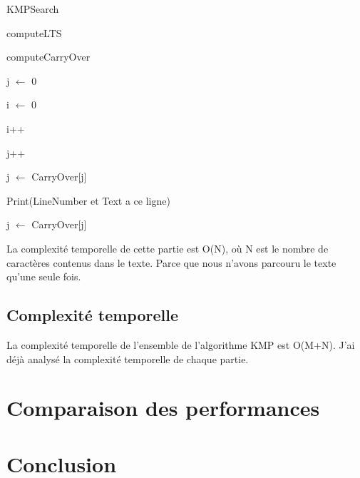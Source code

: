 \documentclass[11pt,english]{article}
\begin{document}
\begin{algorithm}[htbp]
    \SetAlFnt{\footnotesize\sf}

    \caption{KMPSearch}
    
    \Begin
    {
        computeLTS

        computeCarryOver

        j $\leftarrow$ 0

        i $\leftarrow$ 0

        {
            {
               i++

               j++
            }
            \Else
            {
               j $\leftarrow$ CarryOver[j]
            }  

            {
                Print(LineNumber et Text a ce ligne)
                
                j $\leftarrow$ CarryOver[j]
            }
        }

    }
\end{algorithm}

\pagebreak

\indent La complexité temporelle de cette partie est O(N), où N est le nombre de caractères contenus dans le texte. Parce que nous n’avons parcouru le texte qu’une seule fois.

\subsection{Complexité temporelle}

\indent 

La complexité temporelle de l'ensemble de l'algorithme KMP est O(M+N). J'ai déjà analysé la complexité temporelle de chaque partie.

\section{Comparaison des performances}

\section{Conclusion}
\end{document}
